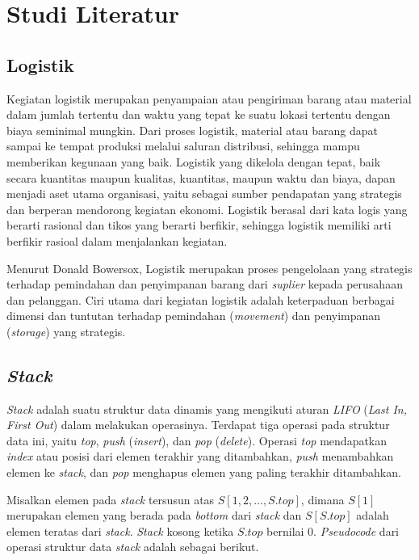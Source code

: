 \chapter{Studi Literatur}

\section{Logistik}

Kegiatan logistik merupakan penyampaian atau pengiriman barang atau material dalam jumlah 
tertentu dan waktu yang tepat ke suatu lokasi tertentu dengan biaya seminimal mungkin. Dari proses 
logistik, material atau barang dapat sampai ke tempat produksi melalui saluran distribusi, sehingga mampu 
memberikan kegunaan yang baik. Logistik yang dikelola dengan tepat, baik secara kuantitas maupun kualitas, kuantitas, 
maupun waktu dan biaya, dapan menjadi aset utama organisasi, yaitu sebagai sumber 
pendapatan yang strategis dan berperan mendorong kegiatan ekonomi. Logistik berasal dari kata logis yang berarti rasional dan tikos yang berarti 
berfikir, sehingga logistik memiliki arti berfikir rasioal dalam menjalankan kegiatan. 

Menurut Donald Bowersox, Logistik merupakan proses pengelolaan yang strategis terhadap pemindahan
dan penyimpanan barang dari \textit{suplier} kepada perusahaan dan pelanggan. Ciri utama dari kegiatan logistik adalah 
keterpaduan berbagai dimensi dan tuntutan terhadap pemindahan (\textit{movement}) dan penyimpanan (\textit{storage}) yang strategis.


\section{\textit{Stack}}

\textit{Stack} adalah suatu struktur data dinamis yang mengikuti aturan \textit{LIFO} (\textit{Last In, First Out}) dalam melakukan operasinya. 
Terdapat tiga operasi pada struktur data ini, yaitu \textit{top}, \textit{push} (\textit{insert}), dan \textit{pop} (\textit{delete}).
Operasi \textit{top} mendapatkan \textit{index} atau posisi dari elemen terakhir yang ditambahkan, \textit{push} 
menambahkan elemen ke \textit{stack}, dan \textit{pop} menghapus elemen yang paling terakhir ditambahkan.

Misalkan elemen pada \textit{stack} tersusun atas $S[1, 2, ..., S.top]$, dimana $S[1]$ merupakan elemen yang berada pada \textit{bottom} dari \textit{stack}
dan $S[S.top]$ adalah elemen teratas dari \textit{stack}. \textit{Stack} kosong ketika $S.top$ bernilai 0. \textit{Pseudocode} dari 
operasi struktur data \textit{stack} adalah sebagai berikut.


